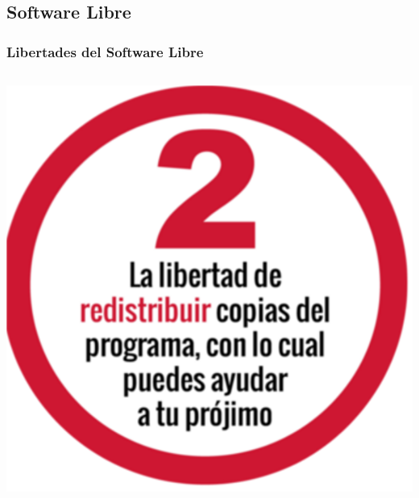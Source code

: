 \subsection{Software Libre}
\begin{frame}
    \frametitle{Libertades del Software Libre}
    \begin{columns}
            \includegraphics[width=\textwidth]{Libertad-2.png}
    \end{columns}
\end{frame}

